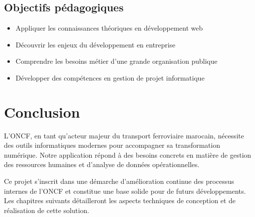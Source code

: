 \subsection{Objectifs pédagogiques}

\begin{itemize}
    \item Appliquer les connaissances théoriques en développement web
    \item Découvrir les enjeux du développement en entreprise
    \item Comprendre les besoins métier d'une grande organisation publique
    \item Développer des compétences en gestion de projet informatique
\end{itemize}

\section{Conclusion}

L'ONCF, en tant qu'acteur majeur du transport ferroviaire marocain, nécessite des outils informatiques modernes pour accompagner sa transformation numérique. Notre application répond à des besoins concrets en matière de gestion des ressources humaines et d'analyse de données opérationnelles.

Ce projet s'inscrit dans une démarche d'amélioration continue des processus internes de l'ONCF et constitue une base solide pour de futurs développements. Les chapitres suivants détailleront les aspects techniques de conception et de réalisation de cette solution.